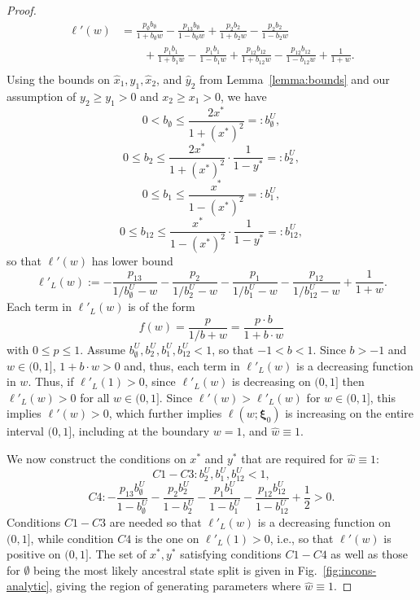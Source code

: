 \begin{proof}
\begin{align*}
\ell'(w) &=  \frac{p_{\emptyset}b_{\emptyset}}{1 + b_{\emptyset}w} - \frac{p_{13}b_{\emptyset}}{1 - b_{\emptyset}w} + \frac{p_{2}b_{2}}{1 + b_{2}w} - \frac{p_{2}b_{2}}{1 - b_{2}w} \\
         &\qquad + \frac{p_{1}b_{1}}{1 + b_{1}w} - \frac{p_{1}b_{1}}{1 - b_{1}w} + \frac{p_{12}b_{12}}{1 + b_{12}w} - \frac{p_{12}b_{12}}{1 - b_{12}w} + \frac{1}{1+w}.\\
\end{align*}
Using the bounds on $\hat{x}_1,\hat{y}_1,\hat{x}_2$, and $\hat{y}_2$ from Lemma~\ref{lemma:bounds} and our assumption of $y_2 \ge y_1 > 0$ and $x_2 \ge x_1 > 0$, we have
\[
0 < b_{\emptyset} \le \frac{2x^*}{1+(x^*)^2} =: b_{\emptyset}^U,
\]
\[
0 \le b_{2} \le \frac{2x^*}{1+(x^*)^2}\cdot\frac{1}{1-y^*} =: b_{2}^U,
\]
\[
0 \le b_{1} \le \frac{x^*}{1-(x^*)^2} =: b_{1}^U,
\]
\[
0 \le b_{12} \le \frac{x^*}{1-(x^*)^2}\cdot\frac{1}{1-y^*} =: b_{12}^U,
\]
so that $\ell'(w)$ has lower bound
\[
\ell'_{L}(w) :=  -\frac{p_{13}}{1/b_{\emptyset}^U - w} - \frac{p_{2}}{1/b_{2}^U - w} - \frac{p_{1}}{1/b_{1}^U - w} - \frac{p_{12}}{1/b_{12}^U - w} + \frac{1}{1+w}.
\]
Each term in $\ell'_{L}(w)$ is of the form
\[
f(w) = \frac{p}{1/b + w} = \frac{p\cdot b}{1 + b\cdot w}
\]
with $0 \le p \le 1$.
Assume $b_{\emptyset}^U, b_{2}^U, b_{1}^U, b_{12}^U < 1$, so that $-1 < b < 1$.
Since $b > -1$ and $w\in(0,1]$, $1+b\cdot w > 0$ and, thus, each term in $\ell'_{L}(w)$ is a decreasing function in $w$.
Thus, if $\ell'_{L}(1) > 0$, since $\ell'_{L}(w)$ is decreasing on $(0,1]$ then $\ell'_{L}(w) > 0$ for all $w\in (0,1]$.
Since $\ell'(w) > \ell'_{L}(w)$ for $w\in(0,1]$, this implies $\ell'(w) > 0$, which further implies $\ell(w; \boldsymbol\xi_0)$ is increasing on the entire interval $(0,1]$, including at the boundary $w=1$, and $\hat{w} \equiv 1$.

We now construct the conditions on $x^*$ and $y^*$ that are required for $\hat{w}\equiv 1$:
\[
C1-C3: b_{2}^U, b_{1}^U, b_{12}^U < 1,
\]
\[
C4: -\frac{p_{13}b_{\emptyset}^U}{1-b_{\emptyset}^U} - \frac{p_{2}b_{2}^U}{1-b_{2}^U} - \frac{p_{1}b_{1}^U}{1-b_{1}^U} - \frac{p_{12}b_{12}^U}{1-b_{12}^U} + \frac{1}{2} > 0.
\]
Conditions $C1-C3$ are needed so that $\ell'_{L}(w)$ is a decreasing function on $(0,1]$, while condition $C4$ is the one on $\ell'_{L}(1) > 0$, i.e., so that $\ell'(w)$ is positive on $(0,1]$.
The set of $x^*,y^*$ satisfying conditions $C1-C4$ as well as those for $\emptyset$ being the most likely ancestral state split is given in Fig.~\ref{fig:incons-analytic}, giving the region of generating parameters where $\hat{w}\equiv 1$.
\end{proof}

